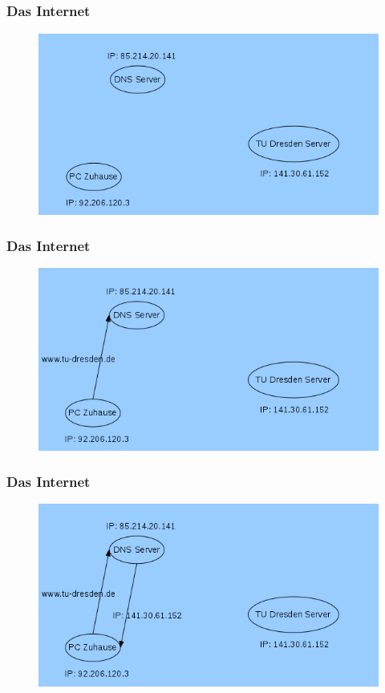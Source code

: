 \documentclass[12pt]{beamer}
\begin{document}
\subsection{}

\begin{frame}
  \frametitle{Das Internet}
  \begin{figure}
    \includegraphics[height=0.7\textheight]{img/internetstruktur-1.png}
  \end{figure}
\end{frame}

\begin{frame}
  \frametitle{Das Internet}
  \begin{figure}
    \includegraphics[height=0.7\textheight]{img/internetstruktur-2.png}
  \end{figure}
\end{frame}

\begin{frame}
  \frametitle{Das Internet}
  \begin{figure}
    \includegraphics[height=0.7\textheight]{img/internetstruktur-3.png}
  \end{figure}
\end{frame}
\end{document}
